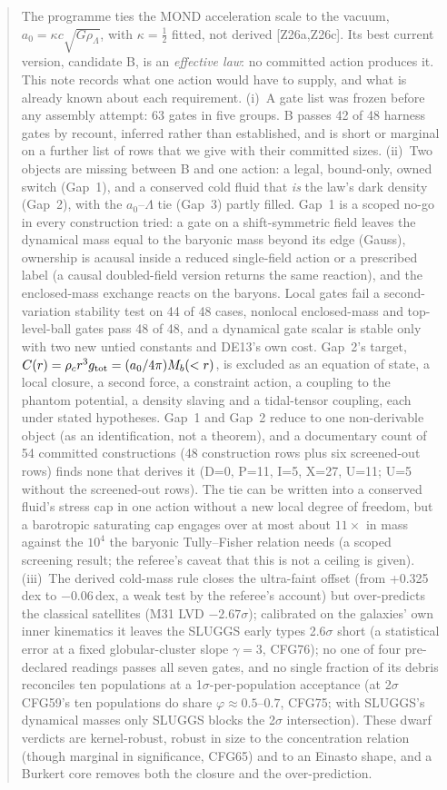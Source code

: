 \documentclass[10pt]{article}
\begin{document}
\begin{abstract}
\noindent The programme ties the MOND acceleration scale to the vacuum, $a_0=\kappa c\sqrt{G\rho_\Lambda}$, with $\kappa=\tfrac12$ fitted, not derived [Z26a,Z26c]. Its best current version, candidate B, is an \emph{effective law}: no committed action produces it. This note records what one action would have to supply, and what is already known about each requirement. (i)~A gate list was frozen before any assembly attempt: 63 gates in five groups. B passes 42 of 48 harness gates by recount, inferred rather than established, and is short or marginal on a further list of rows that we give with their committed sizes. (ii)~Two objects are missing between B and one action: a legal, bound-only, owned switch (Gap~1), and a conserved cold fluid that \emph{is} the law's dark density (Gap~2), with the $a_0$--$\Lambda$ tie (Gap~3) partly filled. Gap~1 is a scoped no-go in every construction tried: a gate on a shift-symmetric field leaves the dynamical mass equal to the baryonic mass beyond its edge (Gauss), ownership is acausal inside a reduced single-field action or a prescribed label (a causal doubled-field version returns the same reaction), and the enclosed-mass exchange reacts on the baryons. Local gates fail a second-variation stability test on 44 of 48 cases, nonlocal enclosed-mass and top-level-ball gates pass 48 of 48, and a dynamical gate scalar is stable only with two new untied constants and DE13's own cost. Gap~2's target, $C(r)=\rho_c r^3 g_{\rm tot}=(a_0/4\pi)M_b(<r)$, is excluded as an equation of state, a local closure, a second force, a constraint action, a coupling to the phantom potential, a density slaving and a tidal-tensor coupling, each under stated hypotheses. Gap~1 and Gap~2 reduce to one non-derivable object (as an identification, not a theorem), and a documentary count of 54 committed constructions (48 construction rows plus six screened-out rows) finds none that derives it (D=0, P=11, I=5, X=27, U=11; U=5 without the screened-out rows). The tie can be written into a conserved fluid's stress cap in one action without a new local degree of freedom, but a barotropic saturating cap engages over at most about $11\times$ in mass against the $10^4$ the baryonic Tully--Fisher relation needs (a scoped screening result; the referee's caveat that this is not a ceiling is given). (iii)~The derived cold-mass rule closes the ultra-faint offset (from +0.325\,dex to $-0.06$\,dex, a weak test by the referee's account) but over-predicts the classical satellites (M31 LVD $-2.67\sigma$); calibrated on the galaxies' own inner kinematics it leaves the SLUGGS early types 2.6$\sigma$ short (a statistical error at a fixed globular-cluster slope $\gamma=3$, CFG76); no one of four pre-declared readings passes all seven gates, and no single fraction of its debris reconciles ten populations at a 1$\sigma$-per-population acceptance (at 2$\sigma$ CFG59's ten populations do share $\varphi\approx0.5$--$0.7$, CFG75; with SLUGGS's dynamical masses only SLUGGS blocks the 2$\sigma$ intersection). These dwarf verdicts are kernel-robust, robust in size to the concentration relation (though marginal in significance, CFG65) and to an Einasto shape, and a Burkert core removes both the closure and the over-prediction. 
\end{abstract}
\end{document}
